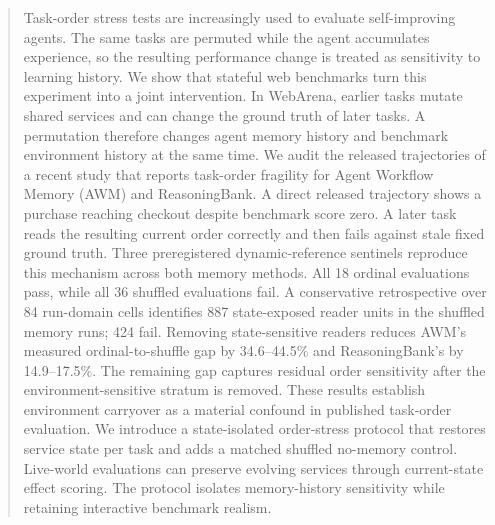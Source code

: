 \begin{abstract}
Task-order stress tests are increasingly used to evaluate self-improving agents. The same tasks are permuted while the agent accumulates experience, so the resulting performance change is treated as sensitivity to learning history. We show that stateful web benchmarks turn this experiment into a joint intervention. In WebArena, earlier tasks mutate shared services and can change the ground truth of later tasks. A permutation therefore changes agent memory history and benchmark environment history at the same time. We audit the released trajectories of a recent study that reports task-order fragility for Agent Workflow Memory (AWM) and ReasoningBank. A direct released trajectory shows a purchase reaching checkout despite benchmark score zero. A later task reads the resulting current order correctly and then fails against stale fixed ground truth. Three preregistered dynamic-reference sentinels reproduce this mechanism across both memory methods. All 18 ordinal evaluations pass, while all 36 shuffled evaluations fail. A conservative retrospective over 84 run-domain cells identifies 887 state-exposed reader units in the shuffled memory runs; 424 fail. Removing state-sensitive readers reduces AWM's measured ordinal-to-shuffle gap by 34.6--44.5\% and ReasoningBank's by 14.9--17.5\%. The remaining gap captures residual order sensitivity after the environment-sensitive stratum is removed. These results establish environment carryover as a material confound in published task-order evaluation. We introduce a state-isolated order-stress protocol that restores service state per task and adds a matched shuffled no-memory control. Live-world evaluations can preserve evolving services through current-state effect scoring. The protocol isolates memory-history sensitivity while retaining interactive benchmark realism.
\end{abstract}
